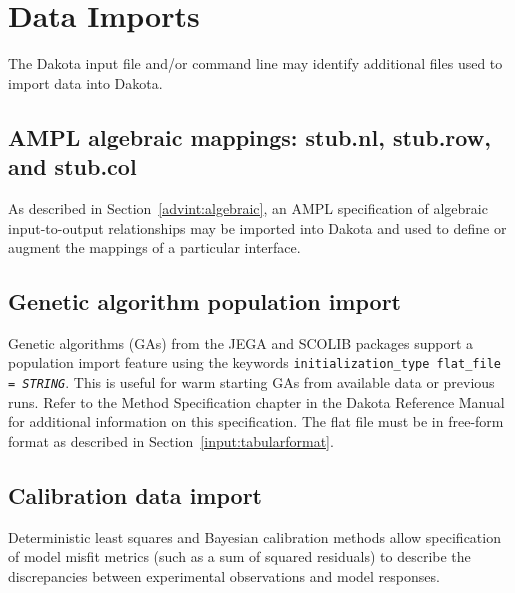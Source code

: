 \section{Data Imports}\label{input:import}

The Dakota input file and/or command line may identify additional
files used to import data into Dakota.

\subsection{AMPL algebraic mappings: stub.nl, stub.row, and stub.col}

As described in Section~\ref{advint:algebraic}, an AMPL
specification of algebraic input-to-output relationships may be
imported into Dakota and used to define or augment the mappings of a
particular interface.

\subsection{Genetic algorithm population import}

Genetic algorithms (GAs) from the JEGA and SCOLIB packages support a
population import feature using the keywords
\texttt{initialization\_type flat\_file = \emph{STRING}}.  This is
useful for warm starting GAs from available data or previous runs.
Refer to the Method Specification chapter in the Dakota Reference
Manual~\cite{RefMan} for additional information on this specification.
The flat file must be in free-form format as described in
Section~\ref{input:tabularformat}.

\subsection{Calibration data import}\label{input:calib_data}


Deterministic least squares and Bayesian calibration methods allow 
specification of model misfit metrics (such as a sum of squared residuals) 
to describe the discrepancies between experimental observations and model 
responses.

